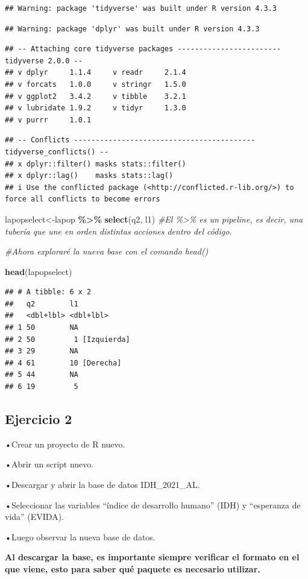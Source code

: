 \documentclass[
]{article}
\newenvironment{Shaded}{\begin{snugshade}}{\end{snugshade}}
\newcommand{\CommentTok}[1]{\textcolor[rgb]{0.56,0.35,0.01}{\textit{#1}}}
\newcommand{\FunctionTok}[1]{\textcolor[rgb]{0.13,0.29,0.53}{\textbf{#1}}}
\newcommand{\NormalTok}[1]{#1}
\newcommand{\OtherTok}[1]{\textcolor[rgb]{0.56,0.35,0.01}{#1}}
\newcommand{\SpecialCharTok}[1]{\textcolor[rgb]{0.81,0.36,0.00}{\textbf{#1}}}
\begin{document}
\begin{verbatim}
## Warning: package 'tidyverse' was built under R version 4.3.3
\end{verbatim}

\begin{verbatim}
## Warning: package 'dplyr' was built under R version 4.3.3
\end{verbatim}

\begin{verbatim}
## -- Attaching core tidyverse packages ------------------------ tidyverse 2.0.0 --
## v dplyr     1.1.4     v readr     2.1.4
## v forcats   1.0.0     v stringr   1.5.0
## v ggplot2   3.4.2     v tibble    3.2.1
## v lubridate 1.9.2     v tidyr     1.3.0
## v purrr     1.0.1
\end{verbatim}

\begin{verbatim}
## -- Conflicts ------------------------------------------ tidyverse_conflicts() --
## x dplyr::filter() masks stats::filter()
## x dplyr::lag()    masks stats::lag()
## i Use the conflicted package (<http://conflicted.r-lib.org/>) to force all conflicts to become errors
\end{verbatim}

\begin{Shaded}
\begin{Highlighting}[]
\NormalTok{lapopselect}\OtherTok{\textless{}{-}}\NormalTok{lapop }\SpecialCharTok{\%\textgreater{}\%} \FunctionTok{select}\NormalTok{(q2, l1) }\CommentTok{\#El \%\textgreater{}\% es un pipeline, es decir, una tubería que une en orden distintas acciones dentro del código.}



\CommentTok{\#Ahora exploraré la nueva base con el comando head()}

\FunctionTok{head}\NormalTok{(lapopselect)}
\end{Highlighting}
\end{Shaded}

\begin{verbatim}
## # A tibble: 6 x 2
##   q2        l1            
##   <dbl+lbl> <dbl+lbl>     
## 1 50        NA            
## 2 50         1 [Izquierda]
## 3 29        NA            
## 4 61        10 [Derecha]  
## 5 44        NA            
## 6 19         5
\end{verbatim}

\subsection{Ejercicio 2}\label{ejercicio-2}

•Crear un proyecto de R nuevo.

•Abrir un script nuevo.

•Descargar y abrir la base de datos IDH\_2021\_AL.

•Seleccionar las variables ``índice de desarrollo humano'' (IDH) y
``esperanza de vida'' (EVIDA).

•Luego observar la nueva base de datos.

\textbf{Al descargar la base, es importante siempre verificar el formato
en el que viene, esto para saber qué paquete es necesario utilizar.}
\end{document}
